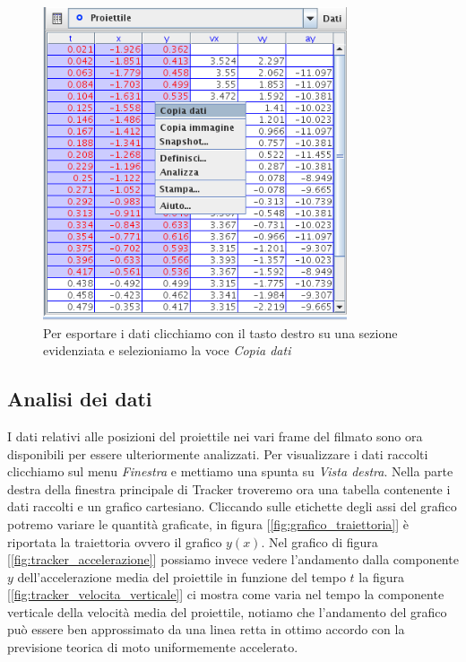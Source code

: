 \documentclass[a4paper,10pt,oneside]{article}
\begin{document}
\begin{figure}[H]
 \centering
 \includegraphics[width=0.8\textwidth]{./immagini/export_dati_ita.png}
 \caption{Per esportare i dati clicchiamo con il tasto destro su una sezione evidenziata e selezioniamo la voce \emph{Copia dati}}
 \label{fig:export_dati}
\end{figure}







\subsection*{Analisi dei dati}

I dati relativi alle posizioni del proiettile nei vari frame del filmato sono ora disponibili per essere ulteriormente analizzati. Per visualizzare i dati raccolti clicchiamo sul menu \textsl{Finestra} e mettiamo una spunta su \textsl{Vista destra}. Nella parte destra della finestra principale di Tracker troveremo ora una tabella contenente i dati raccolti e un grafico cartesiano. Cliccando sulle etichette degli assi del grafico potremo variare le quantità graficate, in figura [\ref{fig:grafico_traiettoria}] è riportata la traiettoria ovvero il grafico $y(x)$. Nel grafico di figura [\ref{fig:tracker_accelerazione}] possiamo invece vedere l'andamento dalla componente $y$ dell'accelerazione media del proiettile in funzione del tempo $t$ la figura [\ref{fig:tracker_velocita_verticale}] ci mostra come varia nel tempo la componente verticale della velocità media del proiettile, notiamo che l'andamento del grafico può essere ben approssimato da una linea retta in ottimo accordo con la previsione teorica di moto uniformemente accelerato.
\end{document}
